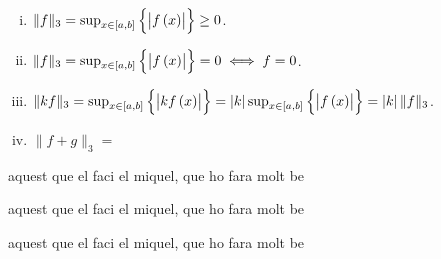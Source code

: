 \begin{eje}
\begin{enumerate}[(a)]
\begin{enumerate}[i)]
                \item $\| f \|_3 = \sup_{x\in \left[ a, b \right]} \left\{ \left| f \left( x \right) \right| \right\} \geq 0$.
                \item $\| f \|_3 = \sup_{x\in \left[ a, b \right]} \left\{ \left| f \left( x \right) \right| \right\} = 0 \iff f=0$.
                \item $\| kf \|_3 = \sup_{x\in \left[ a, b \right]} \left\{ \left| kf \left( x \right) \right| \right\} = \left| k \right|\sup_{x\in \left[ a, b \right]} \left\{ \left| f \left( x \right) \right| \right\} = \left| k \right| \| f \|_3$.
                \item $\| f+g \|_3 =$
            \end{enumerate}

        \end{enumerate}
\end{eje}

\begin{eje}
aquest que el faci el miquel, que ho fara molt be
\end{eje}

\begin{eje}
aquest que el faci el miquel, que ho fara molt be
\end{eje}

\begin{eje}
aquest que el faci el miquel, que ho fara molt be
\end{eje}


